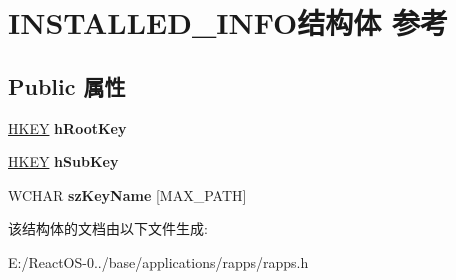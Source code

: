 \hypertarget{struct_i_n_s_t_a_l_l_e_d___i_n_f_o}{}\section{I\+N\+S\+T\+A\+L\+L\+E\+D\+\_\+\+I\+N\+F\+O结构体 参考}
\label{struct_i_n_s_t_a_l_l_e_d___i_n_f_o}
\subsection*{Public 属性}
\begin{DoxyCompactItemize}
\item 
\mbox{\label{struct_i_n_s_t_a_l_l_e_d___i_n_f_o_a98ac0ad96efa54544ac42653d5ddbad8}} 
\hyperlink{interfacevoid}{H\+K\+EY} {\bfseries h\+Root\+Key}
\item 
\mbox{\label{struct_i_n_s_t_a_l_l_e_d___i_n_f_o_a2e9c30c453ec72619609fd2610dddf44}} 
\hyperlink{interfacevoid}{H\+K\+EY} {\bfseries h\+Sub\+Key}
\item 
\mbox{\label{struct_i_n_s_t_a_l_l_e_d___i_n_f_o_ab30e3ca98475fa2d0b63f7d2ee7f05a7}} 
W\+C\+H\+AR {\bfseries sz\+Key\+Name} \mbox{[}M\+A\+X\+\_\+\+P\+A\+TH\mbox{]}
\end{DoxyCompactItemize}


该结构体的文档由以下文件生成\+:\begin{DoxyCompactItemize}
\item 
E\+:/\+React\+O\+S-\/0../base/applications/rapps/rapps.\+h\end{DoxyCompactItemize}
